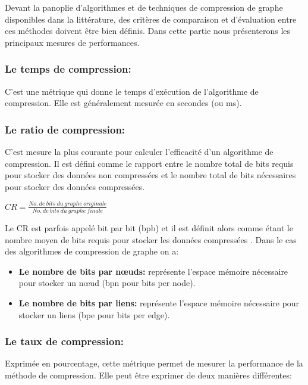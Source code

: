 	
				Devant la panoplie d'algorithmes et de techniques de compression de graphe disponibles dans la littérature, des critères de comparaison  et d'évaluation entre ces méthodes doivent être bien définis. Dans cette partie nous présenterons les principaux mesures de performances.
				
				\subsubsection{Le temps de compression:}
				C'est une métrique qui donne le temps d'exécution de l'algorithme de compression. Elle est généralement mesurée en secondes (ou ms).
				\subsubsection{Le ratio de compression:}
				C'est mesure la plus courante pour calculer l'efficacité d'un algorithme de compression. Il est défini comme le rapport entre le nombre total de bits requis pour stocker des données non compressées et le nombre total de bits nécessaires pour stocker des données compressées.
				\begin{center}
				$
				CR = \frac{No.\ de\ bits\ du\ graphe\ originale}{No.\ de\ bits\ du\ graphe\ finale }
				$
				\end{center}
				
				
				Le CR est parfois appelé bit par bit (bpb) et il est définit alors comme étant le nombre moyen de bits requis pour stocker les données compressées \citep{uthayakumar2018survey}. Dans le cas des algorithmes de compression de graphe on a:
				\begin{itemize}
					\item \textbf{Le nombre de bits par nœuds:}
					représente l'espace mémoire nécessaire pour stocker un nœud (bpn pour bits per node).
					
					\item \textbf{Le nombre de bits par liens:}
					représente l'espace mémoire nécessaire pour stocker un liens (bpe pour bits per edge).
				\end{itemize}
				
				
				
				
				
				
				\subsubsection{Le taux de compression:}
				Exprimée en pourcentage, cette métrique permet de mesurer la performance de la méthode de compression. Elle peut être exprimer de deux manières différentes:
				
